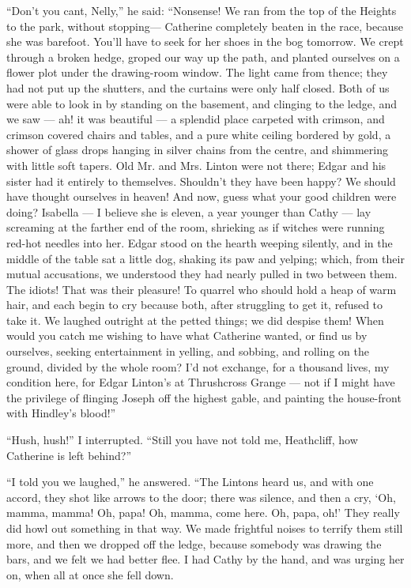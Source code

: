\par “Don't you cant, Nelly,” he said: “Nonsense! We ran from the top of the Heights to the park, without stopping— Catherine completely beaten in the race, because she was barefoot. You'll have to seek for her shoes in the bog tomorrow. We crept through a broken hedge, groped our way up the path, and planted ourselves on a flower plot under the drawing-room window. The light came from thence; they had not put up the shutters, and the curtains were only half closed. Both of us were able to look in by standing on the basement, and clinging to the ledge, and we saw — ah! it was beautiful — a splendid place carpeted with crimson, and crimson covered chairs and tables, and a pure white ceiling bordered by gold, a shower of glass drops hanging in silver chains from the centre, and shimmering with little soft tapers. Old Mr. and Mrs. Linton were not there; Edgar and his sister had it entirely to themselves. Shouldn't they have been happy? We should have thought ourselves in heaven! And now, guess what your good children were doing? Isabella — I believe she is eleven, a year younger than Cathy — lay screaming at the farther end of the room, shrieking as if witches were running red-hot needles into her. Edgar stood on the hearth weeping silently, and in the middle of the table sat a little dog, shaking its paw and yelping; which, from their mutual accusations, we understood they had nearly pulled in two between them. The idiots! That was their pleasure! To quarrel who should hold a heap of warm hair, and each begin to cry because both, after struggling to get it, refused to take it. We laughed outright at the petted things; we did despise them! When would you catch me wishing to have what Catherine wanted, or find us by ourselves, seeking entertainment in yelling, and sobbing, and rolling on the ground, divided by the whole room? I'd not exchange, for a thousand lives, my condition here, for Edgar Linton's at Thrushcross Grange — not if I might have the privilege of flinging Joseph off the highest gable, and painting the house-front with Hindley's blood!”
\par “Hush, hush!” I interrupted. “Still you have not told me, Heathcliff, how Catherine is left behind?”
\par “I told you we laughed,” he answered. “The Lintons heard us, and with one accord, they shot like arrows to the door; there was silence, and then a cry, ‘Oh, mamma, mamma! Oh, papa! Oh, mamma, come here. Oh, papa, oh!’ They really did howl out something in that way. We made frightful noises to terrify them still more, and then we dropped off the ledge, because somebody was drawing the bars, and we felt we had better flee. I had Cathy by the hand, and was urging her on, when all at once she fell down.

